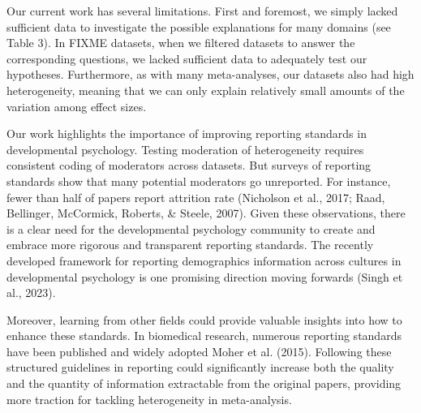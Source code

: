\documentclass[
  man]{apa6}
\begin{document}
Our current work has several limitations. First and foremost, we simply lacked sufficient data to investigate the possible explanations for many domains (see Table 3). In FIXME datasets, when we filtered datasets to answer the corresponding questions, we lacked sufficient data to adequately test our hypotheses. Furthermore, as with many meta-analyses, our datasets also had high heterogeneity, meaning that we can only explain relatively small amounts of the variation among effect sizes.

Our work highlights the importance of improving reporting standards in developmental psychology. Testing moderation of heterogeneity requires consistent coding of moderators across datasets. But surveys of reporting standards show that many potential moderators go unreported. For instance, fewer than half of papers report attrition rate (Nicholson et al., 2017; Raad, Bellinger, McCormick, Roberts, \& Steele, 2007). Given these observations, there is a clear need for the developmental psychology community to create and embrace more rigorous and transparent reporting standards. The recently developed framework for reporting demographics information across cultures in developmental psychology is one promising direction moving forwards (Singh et al., 2023).

Moreover, learning from other fields could provide valuable insights into how to enhance these standards. In biomedical research, numerous reporting standards have been published and widely adopted Moher et al. (2015). Following these structured guidelines in reporting could significantly increase both the quality and the quantity of information extractable from the original papers, providing more traction for tackling heterogeneity in meta-analysis.
\end{document}
